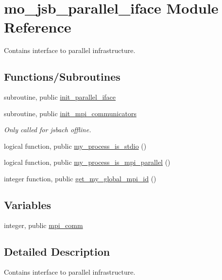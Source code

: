 \hypertarget{namespacemo__jsb__parallel__iface}{}\section{mo\+\_\+jsb\+\_\+parallel\+\_\+iface Module Reference}
\label{namespacemo__jsb__parallel__iface}


Contains interface to parallel infrastructure.  


\subsection*{Functions/\+Subroutines}
\begin{DoxyCompactItemize}
\item 
subroutine, public \hyperlink{namespacemo__jsb__parallel__iface_a2701efacd4758b8d69ba2edfa9cf157d}{init\+\_\+parallel\+\_\+iface}
\item 
subroutine, public \hyperlink{namespacemo__jsb__parallel__iface_a32513d5e93412ac7366922368068e91e}{init\+\_\+mpi\+\_\+communicators}
\begin{DoxyCompactList}\small\item\em Only called for jsbach offline. \end{DoxyCompactList}\item 
logical function, public \hyperlink{namespacemo__jsb__parallel__iface_a9eaf6712087d55f627849cf84c1c1433}{my\+\_\+process\+\_\+is\+\_\+stdio} ()
\item 
logical function, public \hyperlink{namespacemo__jsb__parallel__iface_a14985502c46b4ad49e9bfe01dcb740c5}{my\+\_\+process\+\_\+is\+\_\+mpi\+\_\+parallel} ()
\item 
integer function, public \hyperlink{namespacemo__jsb__parallel__iface_ac6bfd4dbf065e7de054fd412aae074ea}{get\+\_\+my\+\_\+global\+\_\+mpi\+\_\+id} ()
\end{DoxyCompactItemize}
\subsection*{Variables}
\begin{DoxyCompactItemize}
\item 
integer, public \hyperlink{namespacemo__jsb__parallel__iface_a729d21d774b457e2212ba84a1c03a59e}{mpi\+\_\+comm}
\end{DoxyCompactItemize}


\subsection{Detailed Description}
Contains interface to parallel infrastructure. 

